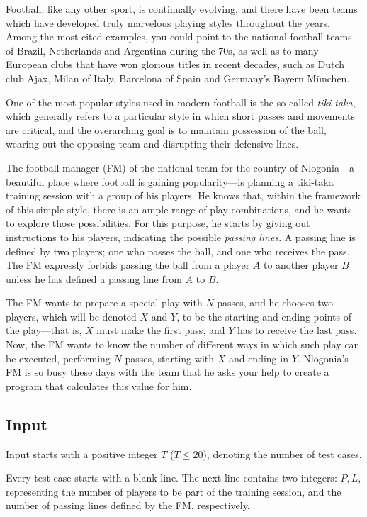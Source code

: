 Football, like any other sport, is continually evolving, and there have
been teams which have developed truly marvelous playing styles
throughout the years. Among the most cited examples, you could point to
the national football teams of Brazil, Netherlands and Argentina during
the 70s, as well as to many European clubs that have won glorious titles
in recent decades, such as Dutch club Ajax, Milan of Italy, Barcelona of
Spain and Germany's Bayern München.

One of the most popular styles used in modern football is the so-called
\emph{tiki-taka}, which generally refers to a particular style in which
short passes and movements are critical, and the overarching goal is to
maintain possession of the ball, wearing out the opposing team and
disrupting their defensive lines.

The football manager (FM) of the national team for the country of
Nlogonia---a beautiful place where football is gaining popularity---is
planning a tiki-taka training session with a group of his players. He
knows that, within the framework of this simple style, there is an ample
range of play combinations, and he wants to explore those possibilities.
For this purpose, he starts by giving out instructions to his players,
indicating the possible \emph{passing lines}. A passing line is defined
by two players; one who passes the ball, and one who receives the pass.
The FM expressly forbids passing the ball from a player $A$ to another
player $B$ unless he has defined a passing line from $A$ to $B$.

The FM wants to prepare a special play with $N$ passes, and he chooses
two players, which will be denoted $X$ and $Y$, to be the starting and
ending points of the play---that is, $X$ must make the first pass, and
$Y$ has to receive the last pass. Now, the FM wants to know the number
of different ways in which such play can be executed, performing $N$
passes, starting with $X$ and ending in $Y$. Nlogonia's FM is so busy
these days with the team that he asks your help to create a program that
calculates this value for him.

\subsection{Input}\label{input}

Input starts with a positive integer $T$ ($T \leq 20$), denoting the
number of test cases.

Every test case starts with a blank line. The next line contains two
integers: $P, L$, representing the number of players to be part of the
training session, and the number of passing lines defined by the FM,
respectively.

